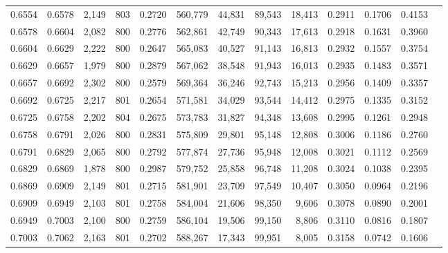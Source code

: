 \begin{tabular}{rrrrrrrrrrrrr}
0.6554 & 0.6578 &  2,149 & 803 &                                     0.2720 & 560,779 &  44,831 &  89,543 &  18,413 & 0.2911 & 0.1706 & 0.4153 \\
0.6578 & 0.6604 &  2,082 & 800 &                                     0.2776 & 562,861 &  42,749 &  90,343 &  17,613 & 0.2918 & 0.1631 & 0.3960 \\
0.6604 & 0.6629 &  2,222 & 800 &                                     0.2647 & 565,083 &  40,527 &  91,143 &  16,813 & 0.2932 & 0.1557 & 0.3754 \\
0.6629 & 0.6657 &  1,979 & 800 &                                     0.2879 & 567,062 &  38,548 &  91,943 &  16,013 & 0.2935 & 0.1483 & 0.3571 \\
0.6657 & 0.6692 &  2,302 & 800 &                                     0.2579 & 569,364 &  36,246 &  92,743 &  15,213 & 0.2956 & 0.1409 & 0.3357 \\
0.6692 & 0.6725 &  2,217 & 801 &                                     0.2654 & 571,581 &  34,029 &  93,544 &  14,412 & 0.2975 & 0.1335 & 0.3152 \\
0.6725 & 0.6758 &  2,202 & 804 &                                     0.2675 & 573,783 &  31,827 &  94,348 &  13,608 & 0.2995 & 0.1261 & 0.2948 \\
0.6758 & 0.6791 &  2,026 & 800 &                                     0.2831 & 575,809 &  29,801 &  95,148 &  12,808 & 0.3006 & 0.1186 & 0.2760 \\
0.6791 & 0.6829 &  2,065 & 800 &                                     0.2792 & 577,874 &  27,736 &  95,948 &  12,008 & 0.3021 & 0.1112 & 0.2569 \\
0.6829 & 0.6869 &  1,878 & 800 &                                     0.2987 & 579,752 &  25,858 &  96,748 &  11,208 & 0.3024 & 0.1038 & 0.2395 \\
0.6869 & 0.6909 &  2,149 & 801 &                                     0.2715 & 581,901 &  23,709 &  97,549 &  10,407 & 0.3050 & 0.0964 & 0.2196 \\
0.6909 & 0.6949 &  2,103 & 801 &                                     0.2758 & 584,004 &  21,606 &  98,350 &   9,606 & 0.3078 & 0.0890 & 0.2001 \\
0.6949 & 0.7003 &  2,100 & 800 &                                     0.2759 & 586,104 &  19,506 &  99,150 &   8,806 & 0.3110 & 0.0816 & 0.1807 \\
0.7003 & 0.7062 &  2,163 & 801 &                                     0.2702 & 588,267 &  17,343 &  99,951 &   8,005 & 0.3158 & 0.0742 & 0.1606 \\

\end{tabular}
